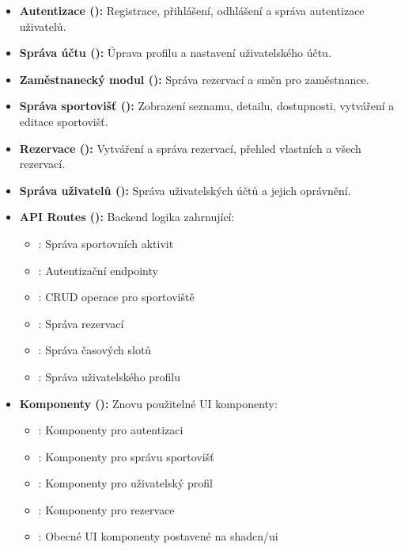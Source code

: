 \documentclass[12pt, a4paper]{article}
\begin{document}
\begin{itemize}
    \item \textbf{Autentizace ():} Registrace, přihlášení, odhlášení a správa autentizace uživatelů.
    \item \textbf{Správa účtu ():} Úprava profilu a nastavení uživatelského účtu.
    \item \textbf{Zaměstnanecký modul ():} Správa rezervací a směn pro zaměstnance.
    \item \textbf{Správa sportovišť ():} Zobrazení seznamu, detailu, dostupnosti, vytváření a editace sportovišť.
    \item \textbf{Rezervace ():} Vytváření a správa rezervací, přehled vlastních a všech rezervací.
    \item \textbf{Správa uživatelů ():} Správa uživatelských účtů a jejich oprávnění.
    \item \textbf{API Routes ():} Backend logika zahrnující:
        \begin{itemize}
            \item {}: Správa sportovních aktivit
            \item {}: Autentizační endpointy
            \item {}: CRUD operace pro sportoviště
            \item {}: Správa rezervací
            \item {}: Správa časových slotů
            \item {}: Správa uživatelského profilu
        \end{itemize}
    \item \textbf{Komponenty ():} Znovu použitelné UI komponenty:
        \begin{itemize}
            \item {}: Komponenty pro autentizaci
            \item {}: Komponenty pro správu sportovišť
            \item {}: Komponenty pro uživatelský profil
            \item {}: Komponenty pro rezervace
            \item {}: Obecné UI komponenty postavené na shadcn/ui

\end{itemize}
\end{itemize}
\end{document}
